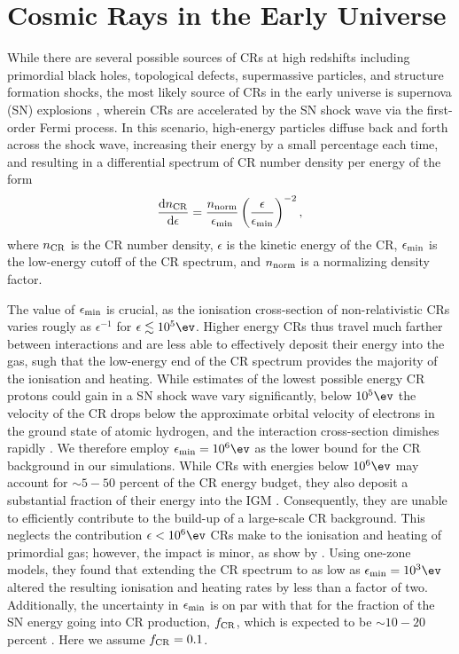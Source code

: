 \section{Cosmic Rays in the Early Universe}
\label{sec:context}
While there are several possible sources of CRs at high redshifts including primordial black holes, topological defects, supermassive particles, and structure formation shocks, the most likely source of CRs in the early universe is supernova (SN) explosions \citep[e.g.,][]{GinzburgSyrovatskii1969,BiermannSigl2001,Stanev2004,Pfrommeretal2006}, wherein CRs are accelerated by the SN shock wave via the first-order Fermi process.  In this scenario, high-energy particles diffuse back and forth across the shock wave, increasing their energy by a small percentage each time, and resulting in a differential spectrum of CR number density per energy \citep{Longair1994} of the form
\begin{equation}
    \frac{{\rm d}n_{\rm \small CR}}{{\rm d}\epsilon} = \frac{n_{\rm norm}}{\epsilon_{\rm min}}
    \left( \frac{\epsilon}{\epsilon_{\rm min}} \right)^{-2},
\end{equation}
where $n_{\rm \small CR}$ is the CR number density, $\epsilon$ is the kinetic energy of the CR, $\epsilon_{\rm min}$ is the low-energy cutoff of the CR spectrum, and $n_{\rm norm}$ is a normalizing density factor. 

The value of $\epsilon_{\rm min}$ is crucial, as the ionisation cross-section of non-relativistic CRs varies rougly as $\epsilon^{-1}$ for $\epsilon \lesssim 10^5\ev$. Higher energy CRs thus travel much farther between interactions and are less able to effectively deposit their energy into the gas, sugh that the low-energy end of the CR spectrum provides the majority of the ionisation and heating.  While estimates of the lowest possible energy CR protons could gain in a SN shock wave vary significantly, below $10^5\ev$ the velocity of the CR drops below the approximate orbital velocity of electrons in the ground state of atomic hydrogen, and the interaction cross-section dimishes rapidly \citep{Schlickeiser2002}. We therefore employ $\epsilon_{\rm min} = 10^6\ev$ as the lower bound for the CR background in our simulations.  While CRs with energies below $10^6\ev$ may account for $\sim$$5-50$ percent of the CR energy budget, they also deposit a substantial fraction of their energy into the IGM \citep{SazonovSunyaev2015}. Consequently, they are unable to efficiently contribute to the build-up of a large-scale CR background. This neglects the contribution $\epsilon < 10^6\ev$ CRs make to the ionisation and heating of primordial gas; however, the impact is minor, as show by \citet{StacyBromm2007}. Using one-zone models, they found that extending the CR spectrum to as low as $\epsilon_{\rm min} = 10^3\ev$ altered the resulting ionisation and heating rates by less than a factor of two.  Additionally, the uncertainty in $\epsilon_{\rm min}$ is on par with that for the fraction of the SN energy going into CR production, $f_{\rm \small CR}$, which is expected to be $\sim$$10-20$ percent \citep{CaprioliSpitovsky2014}.  Here we assume $f_{\rm \small CR} = 0.1$.

